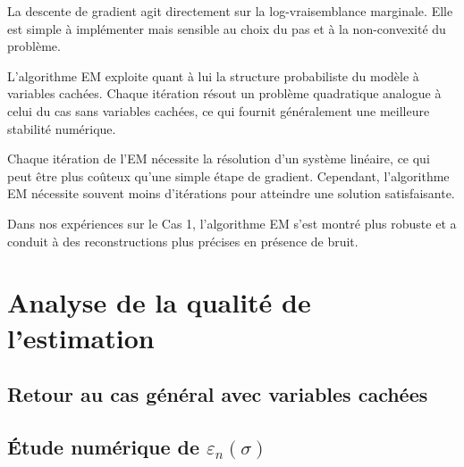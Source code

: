 \documentclass[12pt, a4paper]{article}
\theoremstyle{definition}
\begin{document}
La descente de gradient agit directement sur la log-vraisemblance marginale. Elle est simple à implémenter mais sensible au choix du pas et à la non-convexité du problème.

L’algorithme EM exploite quant à lui la structure probabiliste du modèle à variables cachées. Chaque itération résout un problème quadratique analogue à celui du cas sans variables cachées, ce qui fournit généralement une meilleure stabilité numérique.

Chaque itération de l’EM nécessite la résolution d’un système linéaire, ce qui peut être plus coûteux qu’une simple étape de gradient. Cependant, l’algorithme EM nécessite souvent moins d’itérations pour atteindre une solution satisfaisante.

Dans nos expériences sur le Cas 1, l’algorithme EM s’est montré plus robuste et a conduit à des reconstructions plus précises en présence de bruit.


\newpage
\section{Analyse de la qualité de l'estimation}
\label{sec:analyse_erreur}

\subsection{Retour au cas général avec variables cachées}
\label{subsec:avec_variables_cachees}

\subsection{Étude numérique de \texorpdfstring{$\varepsilon_n(\sigma)$}{epsilon_n(sigma)}}
\label{subsec:etude_numerique_erreur}

\end{document}
